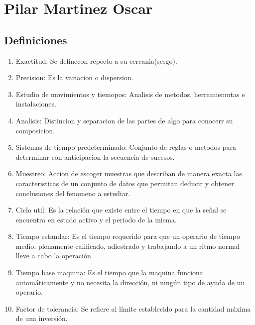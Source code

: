 \section{Pilar Martinez Oscar}
\subsection{Definiciones}

\begin{enumerate}
    \item Exactitud: 
    Se definecon repecto a su cercania(sesgo).
    \item Precision: 
    Es la variacion o dispersion.
    \item Estudio de movimientos y tiemopos:
    Analisis de metodos, herramienmtas e instalaciones. 
    \item Analisis: 
    Distincion y separacion de las partes de algo para conocerr su composicion. 
    \item Sistemas de tiempo predeterminado: 
    Conjunto de reglas o metodos para determinar con anticipacion la secuencia de sucesos.
    \item Muestreo: 
    Accion de escoger muestras que describan de manera exacta las caracteristicas de un  conjunto de datos que permitan deducir y obtener conclusiones del fenomeno a estudiar.
    \item Ciclo util: 
    Es la relación que existe entre el tiempo en que la señal se encuentra en estado activo y el periodo de la misma.
    \item Tiempo estandar: 
    Es el tiempo requerido para que un operario de tiempo medio, plenamente calificado, adiestrado y trabajando a un ritmo normal lleve a cabo la operación.
    \item Tiempo base maquina: 
    Es el tiempo que la maquina funciona automáticamente y no necesita la dirección, ni ningún tipo de ayuda de un operario.
    \item Factor de tolerancia: 
    Se refiere al límite establecido para la cantidad máxima de una inversión.

    
\end{enumerate}
